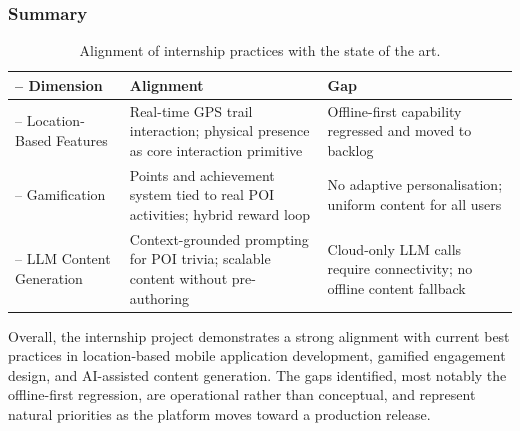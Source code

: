  
\subsubsection{Summary}\label{subsub:contrast:summary}
 
\begin{table}[ht]
\centering
\small
\renewcommand{\arraystretch}{1.4}
\begin{tabular}{@{} >{\centering\arraybackslash}m{3.2cm}
                    >{\centering\arraybackslash}m{5.8cm}
                    >{\centering\arraybackslash}m{5.8cm} @{}}
\toprule
--
\textbf{Dimension} & \textbf{Alignment} & \textbf{Gap} \\
\midrule
\midrule
--
Location-Based Features &
  Real-time GPS trail interaction; physical presence as core
  interaction primitive &
  Offline-first capability regressed and moved to backlog \\
\midrule
--
Gamification &
  Points and achievement system tied to real POI activities;
  hybrid reward loop &
  No adaptive personalisation; uniform content for all users \\
\midrule
--
LLM Content Generation &
  Context-grounded prompting for POI trivia; scalable content
  without pre-authoring &
  Cloud-only LLM calls require connectivity; no offline
  content fallback \\
\bottomrule
\end{tabular}
\caption{Alignment of internship practices with the state of the art.}
\label{tab:contrast}
\end{table}
 
\noindent
Overall, the internship project demonstrates a strong alignment
with current best practices in location-based mobile application
development, gamified engagement design, and AI-assisted content
generation.
The gaps identified, most notably the offline-first regression, are operational rather than conceptual, and represent natural priorities as the platform moves toward a production release. 